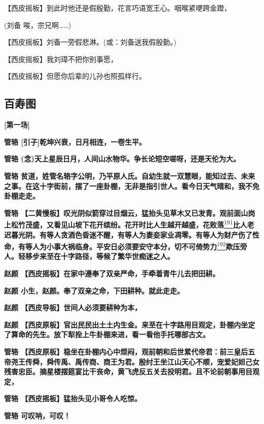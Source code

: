 【西皮摇板】到此时他还是假殷勤，花言巧语宽王心。咽喉紧哽跨金蹬，

(刘备 唉，宗兄啊\ldots{}\ldots{})

【西皮摇板】刘备一旁假悲淋。(或：刘备送我假殷勤。)

【西皮摇板】我刘璋不把你别事愿，

【西皮摇板】但愿你后辈的儿孙也照孤样行。

\newpage
\hypertarget{ux767eux5bffux56fe}{%
\subsection{百寿图}\label{ux767eux5bffux56fe}}

\textbf{{[}第一场{]}}

\textbf{管辂 {[}引子{]}乾坤兴衰，日月相连，一卷生平。}

\textbf{管辂
(念)天上星辰日月，人间山水物华。争长论短空嗟呀，还是天伦为大。}

\textbf{管辂
贫道，姓管名辂字公明，乃平原人氏。自幼生就一双慧眼，能知过去、未来之事。在这十字街前，摆了一座卦棚，无非是指引世人。看今日天气晴和，我不免卦棚走走。}

\textbf{管辂
【二黄慢板】叹光阴似箭穿过目烟云，猛抬头见草木又已发青。观前面山岗上松竹茂盛，又看见山坡下花开缤纷。花开时比人生越开越盛，花败落}\protect\hyperlink{fn191}{\textsuperscript{191}}\textbf{比人老迟暮光阴。有等人贪酒色昏迷不醒，有等人为妻妾家业凋零。有等人为财产伤了性命，有等人为小事大祸临身。平安日必须要安守本分，切不可倚势力}\protect\hyperlink{fn192}{\textsuperscript{192}}\textbf{欺压旁人。轻移步来至在十字路径，等候了繁华世痴迷之人。}

\textbf{赵颜 【西皮摇板】在家中遵奉了双亲严命，手牵着青牛儿去把田耕。}

\textbf{赵颜 小生，赵颜。奉了双亲之命，下田耕种。就此走走。}

\textbf{赵颜 【西皮导板】世间人必须要耕种为本，}

\textbf{赵颜
【西皮原板】官出民民出土土内生金。来至在十字路用目观定，卦棚内坐定了算命的先生。放下犁拴上牛卦棚来进，看一看他手托哪部古文。}

\textbf{管辂
【西皮原板】稳坐在卦棚内心中烦闷，观前朝和后世累代帝君：前三皇后五帝尧王传舜，舜传禹、禹传商、商王为君。殷纣王坐江山天心不顺，宠爱妃妲己女残害忠臣。摘星楼摆筵宴比干丧命，黄飞虎反五关去投明君。且不论前朝事用目观定，}

\textbf{管辂 【西皮摇板】猛抬头见小哥令人吃惊。}

\textbf{管辂 可叹呐，可叹！}

